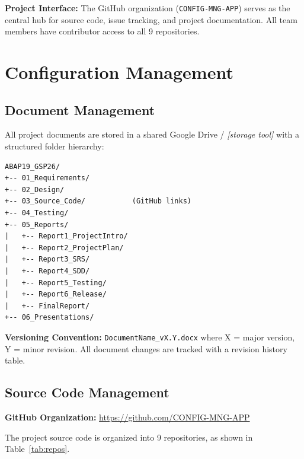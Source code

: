 \documentclass[12pt,a4paper]{report}
\newcommand{\placeholder}[1]{\textcolor{placeholderblue}{\textit{[#1]}}}
\begin{document}
\textbf{Project Interface:} The GitHub organization (\texttt{CONFIG-MNG-APP}) serves as the central hub for source code, issue tracking, and project documentation. All team members have contributor access to all 9 repositories.


\section{Configuration Management}

\subsection{Document Management}

All project documents are stored in a shared Google Drive / \placeholder{storage tool} with a structured folder hierarchy:

\begin{verbatim}
ABAP19_GSP26/
+-- 01_Requirements/
+-- 02_Design/
+-- 03_Source_Code/           (GitHub links)
+-- 04_Testing/
+-- 05_Reports/
|   +-- Report1_ProjectIntro/
|   +-- Report2_ProjectPlan/
|   +-- Report3_SRS/
|   +-- Report4_SDD/
|   +-- Report5_Testing/
|   +-- Report6_Release/
|   +-- FinalReport/
+-- 06_Presentations/
\end{verbatim}

\textbf{Versioning Convention:} \texttt{DocumentName\_vX.Y.docx} where X = major version, Y = minor revision. All document changes are tracked with a revision history table.

\subsection{Source Code Management}

\textbf{GitHub Organization:} \url{https://github.com/CONFIG-MNG-APP}

The project source code is organized into 9 repositories, as shown in Table~\ref{tab:repos}.
\end{document}
